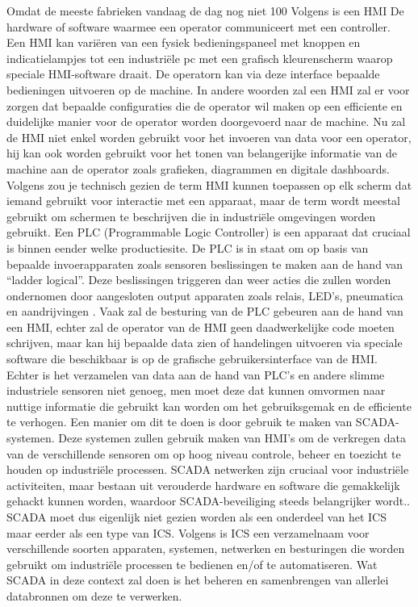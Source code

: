 Omdat de meeste fabrieken vandaag de dag nog niet 100%
Volgens \textcite{Nist2025} is een HMI De hardware of software waarmee een operator communiceert met een controller. Een HMI kan variëren van een fysiek bedieningspaneel met knoppen en indicatielampjes tot een industriële pc met een grafisch kleurenscherm waarop speciale HMI-software draait. De operatorn kan via deze interface bepaalde bedieningen uitvoeren op de machine. In andere woorden zal een HMI zal er voor zorgen dat bepaalde configuraties die de operator wil maken op een efficiente en duidelijke manier voor de operator worden doorgevoerd naar de machine. 
Nu zal de HMI niet enkel worden gebruikt voor het invoeren van data voor een operator, hij kan ook worden gebruikt voor het tonen van belangerijke informatie van de machine aan de operator zoals grafieken, diagrammen en digitale dashboards. \autocite{Inductive2025}
Volgens \textcite{Copadata2025} zou je technisch gezien de term HMI kunnen toepassen op elk scherm dat iemand gebruikt voor interactie met een apparaat, maar de term wordt meestal gebruikt om schermen te beschrijven die in industriële omgevingen worden gebruikt. 
Een PLC (Programmable Logic Controller) is een apparaat dat cruciaal is binnen eender welke productiesite. De PLC is in staat om op basis van bepaalde invoerapparaten zoals sensoren beslissingen te maken aan de hand van “ladder logical”. Deze beslissingen triggeren dan weer acties die zullen worden ondernomen door aangesloten output apparaten zoals relais, LED’s, pneumatica en aandrijvingen \autocite{unitronics2025}.
Vaak zal de besturing van de PLC gebeuren aan de hand van een HMI, echter zal de operator van de HMI geen daadwerkelijke code moeten schrijven, maar kan hij bepaalde data zien of handelingen uitvoeren via speciale software die beschikbaar is op de grafische gebruikersinterface van de HMI. 
Echter is het verzamelen van data aan de hand van PLC’s en andere slimme industriele sensoren niet genoeg, men moet deze dat kunnen omvormen naar nuttige informatie die gebruikt kan worden om het gebruiksgemak en de efficiente te verhogen. Een manier om dit te doen is door gebruik te maken van SCADA-systemen. 
Deze systemen zullen gebruik maken van HMI’s om de verkregen data van de verschillende sensoren om op hoog niveau controle, beheer en toezicht te houden op industriële processen. SCADA netwerken zijn cruciaal voor industriële activiteiten, maar bestaan uit verouderde hardware en software die gemakkelijk gehackt kunnen worden, waardoor SCADA-beveiliging steeds belangrijker wordt.\autocite{FortinetSC2025}. SCADA moet dus eigenlijk niet gezien worden als een onderdeel van het ICS maar eerder als een type van ICS. 
Volgens \textcite{Mhaskar2021} is ICS een verzamelnaam voor verschillende soorten apparaten, systemen, netwerken en besturingen die worden gebruikt om industriële processen te bedienen en/of te automatiseren. Wat SCADA in deze context zal doen is het beheren en samenbrengen van allerlei databronnen om deze te verwerken.


